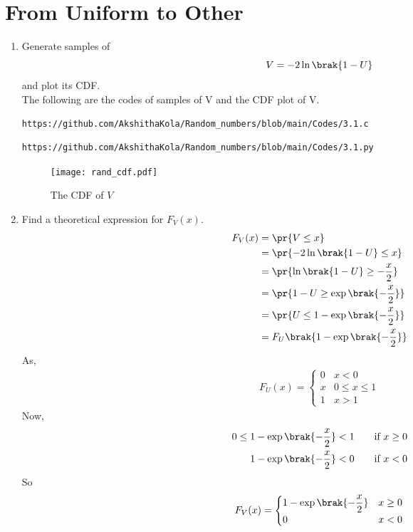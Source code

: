 \documentclass[journal,12pt,twocolumn]{IEEEtran}
\renewcommand\thesection{\arabic{section}}
\begin{document}
\section{From Uniform to Other}
\begin{enumerate}[label=\thesection.\arabic*
,ref=\thesection.\theenumi]
%
\item
Generate samples of 
%
\begin{equation}
V = -2\ln\brak{1-U}
\end{equation}
%
and plot its CDF.  \\
\solution The following are the codes of samples of V and the CDF plot of V.
\begin{lstlisting}
https://github.com/AkshithaKola/Random_numbers/blob/main/Codes/3.1.c
\end{lstlisting}
\begin{lstlisting}
https://github.com/AkshithaKola/Random_numbers/blob/main/Codes/3.1.py
\end{lstlisting}
\begin{figure}
\centering
\texttt{[image: rand\_cdf.pdf]}
\caption{The CDF of $V$}
\label{fig:rand_cdf}
\end{figure}
\item Find a theoretical expression for $F_V(x)$.\\
\solution 
	\begin{align}
		F_V(x) &= \pr{V \leq x} \\
		&= \pr{-2\ln\brak{1-U} \leq x} \\
		&= \pr{\ln\brak{1-U} \geq -\frac{x}{2}} \\
		&= \pr{1-U \geq \exp\brak{-\frac{x}{2}}} \\
		&= \pr{U \leq 1 - \exp\brak{-\frac{x}{2}}} \\
		&= F_U\brak{1 - \exp\brak{-\frac{x}{2}}}
	\end{align}
	As,
	\begin{align}
		F_{U}(x) = 
		\begin{cases}
			0 & x < 0 \\
			x & 0 \le x \le 1 \\
						1 & x > 1
		\end{cases}
	\end{align}
	Now,
	\begin{align}
		0 \leq 1-\exp\brak{-\frac{x}{2}} &< 1 \qquad \text{if } x \geq 0	\\	
		1-\exp\brak{-\frac{x}{2}} &< 0 \qquad \text{if } x < 0	
	\end{align}
	So
	\begin{align}
		F_V(x) = 
		\begin{cases}
			1-\exp\brak{-\dfrac{x}{2}} & x \geq 0 \\
			0 & x < 0
		\end{cases}
	\end{align}
%
\end{enumerate}
\end{document}
